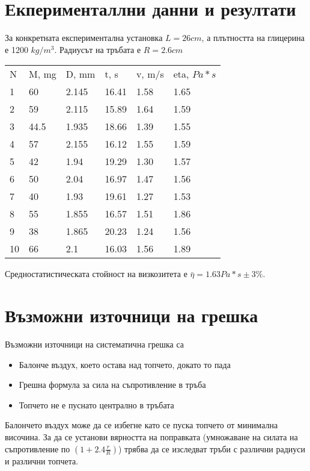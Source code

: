\documentclass[aps, prb, twocolumn, a4paper]{revtex4-2}
\begin{document}
\section{Екперименталлни данни и резултати}
За конкретната експериментална установка $L=26cm$, а плътността на глицерина е 1200 $kg/m^3$. Радиусът на тръбата е $R=2.6 cm$ 

\begin{table}[ht]
\begin{tabular}{llllll}
    N  & M, mg & D, mm & t, s  & v, m/s & eta, $Pa*s$\\
1  & 60    & 2.145 & 16.41 & 1.58   & 1.65                          \\
2  & 59    & 2.115 & 15.89 & 1.64   & 1.59                          \\
3  & 44.5  & 1.935 & 18.66 & 1.39   & 1.55                          \\
4  & 57    & 2.155 & 16.12 & 1.55   & 1.59                          \\
5  & 42    & 1.94  & 19.29 & 1.30   & 1.57                          \\
6  & 50    & 2.04  & 16.97 & 1.47   & 1.56                          \\
7  & 40    & 1.93  & 19.61 & 1.27   & 1.53                          \\
8  & 55    & 1.855 & 16.57 & 1.51   & 1.86                          \\
9  & 38    & 1.865 & 20.23 & 1.24   & 1.56                          \\
10 & 66    & 2.1   & 16.03 & 1.56   & 1.89                     
\end{tabular}
\end{table}

Средностатистическата стойност на визкозитета е $\bar{\eta}=1.63 Pa*s\pm 3\% $. 

\section{Възможни източници на грешка}
Възможни източници на систематична грешка са
\begin{itemize}
    \item Балонче въздух, което остава над топчето, докато то пада
    \item Грешна формула за сила на съпротивление в тръба 
    \item Топчето не е пуснато централно в тръбата
\end{itemize}
Балончето въздух може да се избегне като се пуска топчето от минимална височина. За да се установи вярността на поправката (умножаване на силата на съпротивление по $(1+2.4\frac{r}{R})$) трябва да се изследват тръби с различни радиуси и различни топчета.
\end{document}
